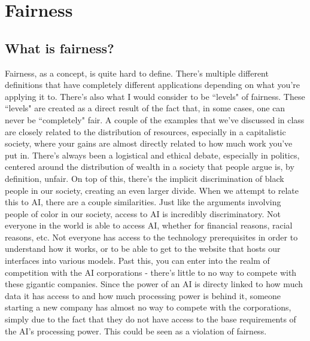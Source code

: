 \documentclass[12pt]{article}
\begin{document}
    \section{Fairness}
    \subsection{What is fairness?}
    Fairness, as a concept, is quite hard to define. There's multiple different definitions that have
    completely different applications depending on what you're applying it to. There's also what I
    would consider to be ``levels" of fairness. These ``levels" are created as a direct result of the
    fact that, in some cases, one can never be ``completely" fair. A couple of the examples that we've
    discussed in class are closely related to the distribution of resources, especially in a capitalistic
    society, where your gains are almost directly related to how much work you've put in. There's always
    been a logistical and ethical debate, especially in politics, centered around the distribution of
    wealth in a society that people argue is, by definition, unfair. On top of this, there's the
    implicit discrimination of black people in our society, creating an even larger divide. When we
    attempt to relate this to AI, there are a couple similarities. Just like the arguments involving
    people of color in our society, access to AI is incredibly discriminatory. Not everyone in the 
    world is able to access AI, whether for financial reasons, racial reasons, etc. Not everyone has
    access to the technology prerequisites in order to understand how it works, or to be able to get
    to the website that hosts our interfaces into various models. Past this, you can enter into the
    realm of competition with the AI corporations - there's little to no way to compete with these
    gigantic companies. Since the power of an AI is directy linked to how much data it has access to
    and how much processing power is behind it, someone starting a new company has almost no way to
    compete with the corporations, simply due to the fact that they do not have access to the base
    requirements of the AI's processing power. This could be seen as a violation of fairness.
\end{document}
